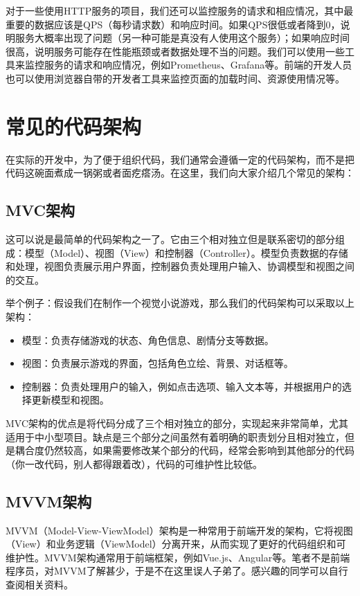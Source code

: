 \documentclass[../main.tex]{subfiles}
\begin{document}
对于一些使用HTTP服务的项目，我们还可以监控服务的请求和相应情况，其中最重要的数据应该是QPS（每秒请求数）和响应时间。如果QPS很低或者降到0，说明服务大概率出现了问题（另一种可能是真没有人使用这个服务）；如果响应时间很高，说明服务可能存在性能瓶颈或者数据处理不当的问题。我们可以使用一些工具来监控服务的请求和响应情况，例如Prometheus、Grafana等。前端的开发人员也可以使用浏览器自带的开发者工具来监控页面的加载时间、资源使用情况等。

\section{常见的代码架构}\label{sec:code-architecture}

在实际的开发中，为了便于组织代码，我们通常会遵循一定的代码架构，而不是把代码这碗面煮成一锅粥或者面疙瘩汤。在这里，我们向大家介绍几个常见的架构：

\subsection{MVC架构}

这可以说是最简单的代码架构之一了。它由三个相对独立但是联系密切的部分组成：模型（Model）、视图（View）和控制器（Controller）。模型负责数据的存储和处理，视图负责展示用户界面，控制器负责处理用户输入、协调模型和视图之间的交互。

举个例子：假设我们在制作一个视觉小说游戏，那么我们的代码架构可以采取以上架构：
\begin{itemize}
  \item 模型：负责存储游戏的状态、角色信息、剧情分支等数据。
  \item 视图：负责展示游戏的界面，包括角色立绘、背景、对话框等。
  \item 控制器：负责处理用户的输入，例如点击选项、输入文本等，并根据用户的选择更新模型和视图。
\end{itemize}

MVC架构的优点是将代码分成了三个相对独立的部分，实现起来非常简单，尤其适用于中小型项目。缺点是三个部分之间虽然有着明确的职责划分且相对独立，但是耦合度仍然较高，如果需要修改某个部分的代码，经常会影响到其他部分的代码（你一改代码，别人都得跟着改），代码的可维护性比较低。

\subsection{MVVM架构}
MVVM（Model-View-ViewModel）架构是一种常用于前端开发的架构，它将视图（View）和业务逻辑（ViewModel）分离开来，从而实现了更好的代码组织和可维护性。MVVM架构通常用于前端框架，例如Vue.js、Angular等。笔者不是前端程序员，对MVVM了解甚少，于是不在这里误人子弟了。感兴趣的同学可以自行查阅相关资料。
\end{document}
